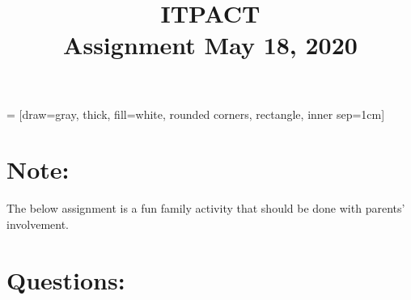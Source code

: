 \documentclass[addpoints,11pt]{exam}
\author{}
\title{ITPACT \\ Assignment May 18, 2020}
\date{}
\begin{document}
   = [draw=gray, thick, fill=white, rounded corners, rectangle, inner sep=1cm]
\maketitle

\pointsinrightmargin

\thispagestyle{head}

\section*{Note:}
The below assignment is a fun family activity that should be done with parents' involvement.

\section*{Questions:}
\end{document}
